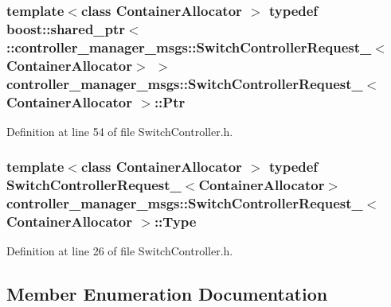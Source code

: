 \subsubsection[{\-Ptr}]{\setlength{\rightskip}{0pt plus 5cm}template$<$class Container\-Allocator $>$ typedef boost\-::shared\-\_\-ptr$<$ \-::{\bf controller\-\_\-manager\-\_\-msgs\-::\-Switch\-Controller\-Request\-\_\-}$<$\-Container\-Allocator$>$ $>$ {\bf controller\-\_\-manager\-\_\-msgs\-::\-Switch\-Controller\-Request\-\_\-}$<$ \-Container\-Allocator $>$\-::{\bf \-Ptr}}\label{structcontroller__manager__msgs_1_1SwitchControllerRequest___a208c7f102b35fbcc5c75c9d8aba20ad8}


\-Definition at line 54 of file \-Switch\-Controller.\-h.

\subsubsection[{\-Type}]{\setlength{\rightskip}{0pt plus 5cm}template$<$class Container\-Allocator $>$ typedef {\bf \-Switch\-Controller\-Request\-\_\-}$<$\-Container\-Allocator$>$ {\bf controller\-\_\-manager\-\_\-msgs\-::\-Switch\-Controller\-Request\-\_\-}$<$ \-Container\-Allocator $>$\-::{\bf \-Type}}\label{structcontroller__manager__msgs_1_1SwitchControllerRequest___aa2ee118ee12d87c505dcf91fb1d855be}


\-Definition at line 26 of file \-Switch\-Controller.\-h.



\subsection{\-Member \-Enumeration \-Documentation}
